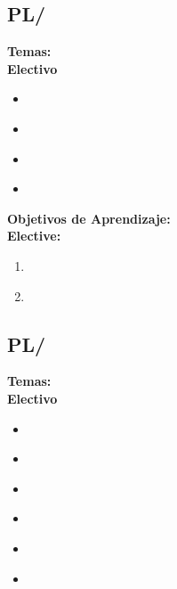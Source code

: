 \subsection{PL/\PLCompilerSemanticAnalysis}\label{sec:BOK:PLCompilerSemanticAnalysis}
\noindent \textbf{Temas:}\\
\noindent \textbf{Electivo}
\begin{itemize}
	\item \PLCompilerSemanticAnalysisTopicHigh\label{sec:BOK:PLCompilerSemanticAnalysisTopicHigh}
	\item \PLCompilerSemanticAnalysisTopicScope\label{sec:BOK:PLCompilerSemanticAnalysisTopicScope}
	\item \PLCompilerSemanticAnalysisTopicType\label{sec:BOK:PLCompilerSemanticAnalysisTopicType}
	\item \PLCompilerSemanticAnalysisTopicDeclarative\label{sec:BOK:PLCompilerSemanticAnalysisTopicDeclarative}
\end{itemize}


\noindent \textbf{Objetivos de Aprendizaje:}\\
\noindent \textbf{Elective:}
\begin{enumerate}
	\setcounter{enumi}{0}
	\item \PLCompilerSemanticAnalysisLOImplementContext\xspace[\PLCompilerSemanticAnalysisLOImplementContextLevel]\label{sec:BOK:PLCompilerSemanticAnalysisLOImplementContext}
	\item \PLCompilerSemanticAnalysisLODescribeSemantic\xspace[\PLCompilerSemanticAnalysisLODescribeSemanticLevel]\label{sec:BOK:PLCompilerSemanticAnalysisLODescribeSemantic}
\end{enumerate}


\subsection{PL/\PLCodeGeneration}\label{sec:BOK:PLCodeGeneration}
\noindent \textbf{Temas:}\\
\noindent \textbf{Electivo}
\begin{itemize}
	\item \PLCodeGenerationTopicProcedure\label{sec:BOK:PLCodeGenerationTopicProcedure}
	\item \PLCodeGenerationTopicSeparate\label{sec:BOK:PLCodeGenerationTopicSeparate}
	\item \PLCodeGenerationTopicInstruction\label{sec:BOK:PLCodeGenerationTopicInstruction}
	\item \PLCodeGenerationTopicInstructionScheduling\label{sec:BOK:PLCodeGenerationTopicInstructionScheduling}
	\item \PLCodeGenerationTopicRegister\label{sec:BOK:PLCodeGenerationTopicRegister}
	\item \PLCodeGenerationTopicPeephole\label{sec:BOK:PLCodeGenerationTopicPeephole}
\end{itemize}



